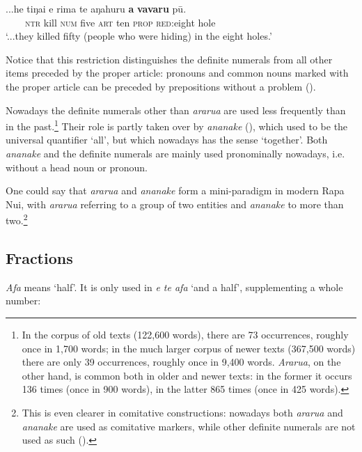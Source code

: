 \ea\label{ex:4.46}
\gll ...he tiŋa{\ꞌ}i e rima te {\ꞌ}aŋahuru \textbf{a} \textbf{vavaru} pū.\\
~~~~\textsc{ntr} kill \textsc{num} five \textsc{art} ten \textsc{prop} \textsc{red}:eight hole\\

\glt
‘...they killed fifty (people who were hiding) in the eight holes.’ \textstyleExampleref{[Mtx-3-01.237]}
\z

Notice that this restriction distinguishes the definite numerals from all other items preceded by the proper article: pronouns and common nouns marked with the proper article can be preceded by prepositions without a problem (). 

Nowadays the definite numerals other than \textit{ararua} are used less frequently than in the past.\footnote{\label{fn:178}In the corpus of old texts (122,600 words), there are 73 occurrences, roughly once in 1,700 words; in the much larger corpus of newer texts (367,500 words) there are only 39 occurrences, roughly once in 9,400 words. \textit{Ararua}, on the other hand, is common both in older and newer texts: in the former it occurs 136 times (once in 900 words), in the latter 865 times (once in 425 words).} Their role is partly taken over by \textit{ananake} (), which used to be the universal quantifier ‘all’, but which nowadays has the sense ‘together’. Both \textit{ananake} and the definite numerals are mainly used pronominally nowadays, i.e. without a head noun or pronoun. 

One could say that \textit{ararua} and \textit{ananake} form a mini-paradigm in modern Rapa Nui, with \textit{ararua} referring to a group of two entities and \textit{ananake} to more than two.\footnote{\label{fn:179}This is even clearer in comitative constructions: nowadays both \textit{ararua} and \textit{ananake} are used as comitative markers, while other definite numerals are not used as such ().} 

\subsection{Fractions}\label{sec:4.3.5}
\textit{{\ꞌ}Afa} means ‘half’. It is only used in \textit{{\ꞌ}e te {\ꞌ}afa} ‘and a half’, supplementing a whole number:

